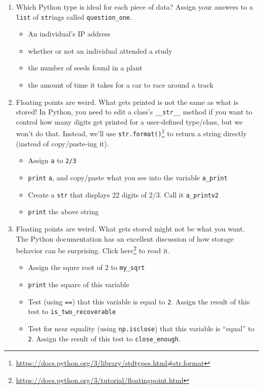 \documentclass[12pt,krantz2]{krantz}
\providecommand{\tightlist}{%
  \setlength{\itemsep}{0pt}\setlength{\parskip}{0pt}}
\renewcommand{\href}[2]{#2\footnote{\url{#1}}}
\begin{document}
\begin{enumerate}
\def\labelenumi{\arabic{enumi}.}
\item
  Which Python type is ideal for each piece of data? Assign your answers to a \texttt{list} of \texttt{str}ings called \texttt{question\_one}.

  \begin{itemize}
  \tightlist
  \item
    An individual's IP address
  \item
    whether or not an individual attended a study
  \item
    the number of seeds found in a plant
  \item
    the amount of time it takes for a car to race around a track
  \end{itemize}
\item
  Floating points are weird. What gets printed is not the same as what is stored! In Python, you need to edit a class's \texttt{\_\_str\_\_} method if you want to control how many digits get printed for a user-defined type/class, but we won't do that. Instead, we'll use \href{https://docs.python.org/3/library/stdtypes.html\#str.format}{\texttt{str.format()}} to return a string directly (instead of copy/paste-ing it).

  \begin{itemize}
  \tightlist
  \item
    Assign \texttt{a} to \texttt{2/3}
  \item
    \texttt{print} \texttt{a}, and copy/paste what you see into the variable \texttt{a\_print}
  \item
    Create a \texttt{str} that displays 22 digits of 2/3. Call it \texttt{a\_printv2}
  \item
    \texttt{print} the above string
  \end{itemize}
\item
  Floating points are weird. What gets stored might not be what you want. The Python documentation has an excellent discussion of how storage behavior can be surprising. Click \href{https://docs.python.org/3/tutorial/floatingpoint.html}{here} to read it.

  \begin{itemize}
  \tightlist
  \item
    Assign the squre root of 2 to \texttt{my\_sqrt}
  \item
    \texttt{print} the square of this variable
  \item
    Test (using \texttt{==}) that this variable is equal to \texttt{2}. Assign the result of this test to \texttt{is\_two\_recoverable}
  \item
    Test for near equality (using \texttt{np.isclose}) that this variable is ``equal'' to \texttt{2}. Assign the result of this test to \texttt{close\_enough}.
  \end{itemize}
\end{enumerate}
\end{document}

